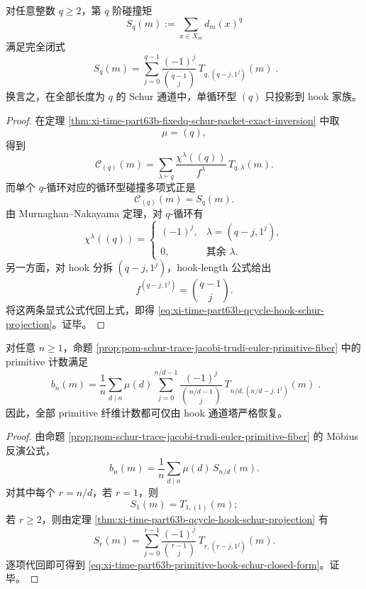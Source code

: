 \begin{theorem}\label{thm:xi-time-part63b-qcycle-hook-schur-projection}
对任意整数 \(q\ge 2\)，第 \(q\) 阶碰撞矩
\[
S_q(m):=\sum_{x\in X_m}d_m(x)^q
\]
满足完全闭式
\begin{equation}\label{eq:xi-time-part63b-qcycle-hook-schur-projection}
\boxed{\;
S_q(m)
=
\sum_{j=0}^{q-1}
\frac{(-1)^j}{\binom{q-1}{j}}\,
T_{q,(q-j,1^j)}(m)\; }.
\end{equation}
换言之，在全部长度为 \(q\) 的 Schur 通道中，单循环型 \((q)\) 只投影到 hook 家族。
\end{theorem}
\begin{proof}
在定理 \ref{thm:xi-time-part63b-fixedq-schur-packet-exact-inversion} 中取
\[
\mu=(q),
\]
得到
\[
\mathcal C_{(q)}(m)
=
\sum_{\lambda\vdash q}\frac{\chi^\lambda((q))}{f^\lambda}\,T_{q,\lambda}(m).
\]
而单个 \(q\)-循环对应的循环型碰撞多项式正是
\[
\mathcal C_{(q)}(m)=S_q(m).
\]
由 Murnaghan--Nakayama 定理，对 \(q\)-循环有
\[
\chi^\lambda((q))
=
\begin{cases}
(-1)^j,& \lambda=(q-j,1^j),\\[2pt]
0,& \text{其余 }\lambda.
\end{cases}
\]
另一方面，对 hook 分拆 \((q-j,1^j)\)，hook-length 公式给出
\[
f^{(q-j,1^j)}=\binom{q-1}{j}.
\]
将这两条显式公式代回上式，即得
\eqref{eq:xi-time-part63b-qcycle-hook-schur-projection}。证毕。
\end{proof}

\begin{corollary}\label{cor:xi-time-part63b-primitive-hook-schur-closed-form}
对任意 \(n\ge 1\)，命题 \ref{prop:pom-schur-trace-jacobi-trudi-euler-primitive-fiber} 中的 primitive 计数满足
\begin{equation}\label{eq:xi-time-part63b-primitive-hook-schur-closed-form}
\boxed{\;
b_n(m)
=
\frac{1}{n}\sum_{d\mid n}\mu(d)
\sum_{j=0}^{n/d-1}
\frac{(-1)^j}{\binom{n/d-1}{j}}\,
T_{n/d,(n/d-j,1^j)}(m)\; }.
\end{equation}
因此，全部 primitive 纤维计数都可仅由 hook 通道塔严格恢复。
\end{corollary}
\begin{proof}
由命题 \ref{prop:pom-schur-trace-jacobi-trudi-euler-primitive-fiber} 的 Möbius 反演公式，
\[
b_n(m)=\frac{1}{n}\sum_{d\mid n}\mu(d)\,S_{n/d}(m).
\]
对其中每个 \(r=n/d\)，若 \(r=1\)，则
\[
S_1(m)=T_{1,(1)}(m);
\]
若 \(r\ge 2\)，则由定理 \ref{thm:xi-time-part63b-qcycle-hook-schur-projection} 有
\[
S_r(m)
=
\sum_{j=0}^{r-1}
\frac{(-1)^j}{\binom{r-1}{j}}\,
T_{r,(r-j,1^j)}(m).
\]
逐项代回即可得到
\eqref{eq:xi-time-part63b-primitive-hook-schur-closed-form}。证毕。
\end{proof}

